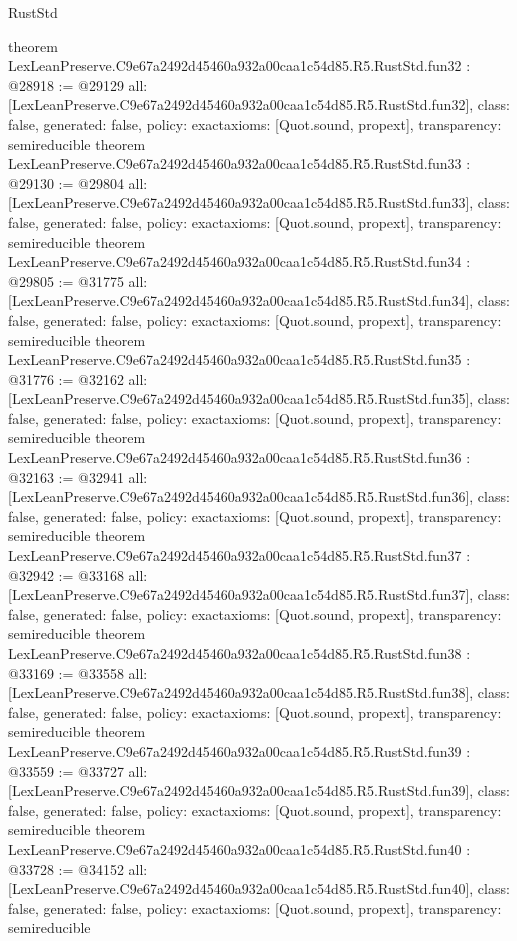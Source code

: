 \begin{lexlean}{RustStd}
\begin{coremodule}
{}
theorem LexLeanPreserve.C9e67a2492d45460a932a00caa1c54d85.R5.RustStd.fun32 : @28918 := @29129 {
  all: [LexLeanPreserve.C9e67a2492d45460a932a00caa1c54d85.R5.RustStd.fun32],
  class: false,
  generated: false,
  policy: exact{axioms: [Quot.sound, propext]},
  transparency: semireducible
}
theorem LexLeanPreserve.C9e67a2492d45460a932a00caa1c54d85.R5.RustStd.fun33 : @29130 := @29804 {
  all: [LexLeanPreserve.C9e67a2492d45460a932a00caa1c54d85.R5.RustStd.fun33],
  class: false,
  generated: false,
  policy: exact{axioms: [Quot.sound, propext]},
  transparency: semireducible
}
theorem LexLeanPreserve.C9e67a2492d45460a932a00caa1c54d85.R5.RustStd.fun34 : @29805 := @31775 {
  all: [LexLeanPreserve.C9e67a2492d45460a932a00caa1c54d85.R5.RustStd.fun34],
  class: false,
  generated: false,
  policy: exact{axioms: [Quot.sound, propext]},
  transparency: semireducible
}
theorem LexLeanPreserve.C9e67a2492d45460a932a00caa1c54d85.R5.RustStd.fun35 : @31776 := @32162 {
  all: [LexLeanPreserve.C9e67a2492d45460a932a00caa1c54d85.R5.RustStd.fun35],
  class: false,
  generated: false,
  policy: exact{axioms: [Quot.sound, propext]},
  transparency: semireducible
}
theorem LexLeanPreserve.C9e67a2492d45460a932a00caa1c54d85.R5.RustStd.fun36 : @32163 := @32941 {
  all: [LexLeanPreserve.C9e67a2492d45460a932a00caa1c54d85.R5.RustStd.fun36],
  class: false,
  generated: false,
  policy: exact{axioms: [Quot.sound, propext]},
  transparency: semireducible
}
theorem LexLeanPreserve.C9e67a2492d45460a932a00caa1c54d85.R5.RustStd.fun37 : @32942 := @33168 {
  all: [LexLeanPreserve.C9e67a2492d45460a932a00caa1c54d85.R5.RustStd.fun37],
  class: false,
  generated: false,
  policy: exact{axioms: [Quot.sound, propext]},
  transparency: semireducible
}
theorem LexLeanPreserve.C9e67a2492d45460a932a00caa1c54d85.R5.RustStd.fun38 : @33169 := @33558 {
  all: [LexLeanPreserve.C9e67a2492d45460a932a00caa1c54d85.R5.RustStd.fun38],
  class: false,
  generated: false,
  policy: exact{axioms: [Quot.sound, propext]},
  transparency: semireducible
}
theorem LexLeanPreserve.C9e67a2492d45460a932a00caa1c54d85.R5.RustStd.fun39 : @33559 := @33727 {
  all: [LexLeanPreserve.C9e67a2492d45460a932a00caa1c54d85.R5.RustStd.fun39],
  class: false,
  generated: false,
  policy: exact{axioms: [Quot.sound, propext]},
  transparency: semireducible
}
theorem LexLeanPreserve.C9e67a2492d45460a932a00caa1c54d85.R5.RustStd.fun40 : @33728 := @34152 {
  all: [LexLeanPreserve.C9e67a2492d45460a932a00caa1c54d85.R5.RustStd.fun40],
  class: false,
  generated: false,
  policy: exact{axioms: [Quot.sound, propext]},
  transparency: semireducible
}
\end{coremodule}
\end{lexlean}

